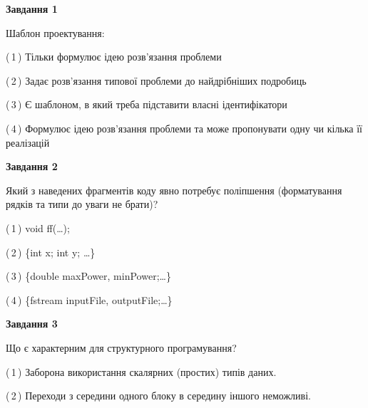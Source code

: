 \documentclass[10pt, ukrainian]{article}
\begin{document}
{
\begin {large}
{\begin {center}\textbf{Завдання 1}\end {center}}\par
Шаблон проектування:\par
\vspace{2mm}



(\,1\,) Тільки формулює ідею розв'язання проблеми%



(\,2\,) Задає розв'язання типової проблеми до найдрібніших подробиць%



(\,3\,) Є шаблоном, в який треба підставити власні ідентифікатори%



(\,4\,) Формулює ідею розв'язання проблеми та може пропонувати одну чи кілька її реалізацій%


{\begin {center}\textbf{Завдання 2}\end {center}}\par
Який з наведених фрагментів коду явно потребує поліпшення (форматування рядків та типи до уваги не брати)?\par
\vspace{2mm}



(\,1\,) void ff(…);%



(\,2\,) \{int x; int y; …\}%



(\,3\,) \{double maxPower, minPower;…\} %



(\,4\,) \{fstream inputFile, outputFile;…\} %


{\begin {center}\textbf{Завдання 3}\end {center}}\par
Що є характерним для структурного програмування?\par
\vspace{2mm}



(\,1\,) Заборона використання скалярних (простих) типів даних. %



(\,2\,) Переходи з середини одного блоку в середину іншого неможливі. %




\end{large}}
\end{document}
